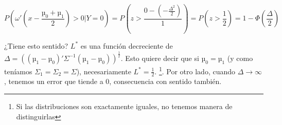 \begin{problem}[6]
\[
P\left(ω'\left(x-\frac{µ_0 + µ_1}{2}\right) > 0 | Y=0\right) = P\left(z>\frac{0 - \left(-\frac{\Delta^2}{2}\right)}{1}\right) = P\left(z>\frac{1}{2}\right) = 1-\Phi\left(\frac{\Delta}{2}\right)
\]

¿Tiene esto sentido? $L^{\ast}$ es una función decreciente de $Δ = \left((µ_1 - µ_0)'Σ^{-1}(µ_1-µ_0)\right)^{\frac{1}{2}}$. Esto quiere decir que si $µ_0 = µ_1$ (y como teníamos $Σ_1 = Σ_2 = Σ$), necesariamente $L^{\ast} = \frac{1}{2}$. \footnote{Si las distribuciones son exactamente iguales, no tenemos manera de distinguirlas}. Por otro lado, cuando $Δ\to ∞$, tenemos un error que tiende a 0, consecuencia con sentido también. 

\end{problem}
